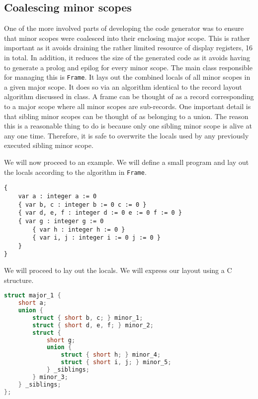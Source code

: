 \documentclass[oneside]{amsart}
\theoremstyle{definition}
\theoremstyle{remark}
\numberwithin{equation}{section}
\begin{document}
\subsection{Coalescing minor scopes}
One of the more involved parts of developing the code generator was to ensure that minor scopes were
coalesced into their enclosing major scope. This is rather important as it avoids draining the
rather limited resource of display registers, 16 in total. In addition, it reduces the size of the
generated code as it avoids having to generate a prolog and epilog for every minor scope. The main
class responsible for managing this is \texttt{Frame}. It lays out the combined locals of all minor
scopes in a given major scope. It does so via an algorithm identical to the record layout algorithm
discussed in class. A frame can be thought of as a record corresponding to a major scope where all
minor scopes are sub-records. One important detail is that sibling minor scopes can be thought of as
belonging to a union. The reason this is a reasonable thing to do is because only one sibling minor
scope is alive at any one time. Therefore, it is safe to overwrite the locals used by any previously
executed sibling minor scope.

\newpage

We will now proceed to an example. We will define a small program and lay out the locals according
to the algorithm in \texttt{Frame}.
\begin{lstlisting}[caption=Major scope in 488]
{
    var a : integer a := 0
    { var b, c : integer b := 0 c := 0 }
    { var d, e, f : integer d := 0 e := 0 f := 0 }
    { var g : integer g := 0
        { var h : integer h := 0 }
        { var i, j : integer i := 0 j := 0 }
    }
}
\end{lstlisting}

\noindent We will proceed to lay out the locals. We will express our layout using a C structure.
\begin{lstlisting}[caption=Layout as C structure, language=C, directivestyle={\color{black}} emph={short}, emphstyle={\color{blue}}]
struct major_1 {
    short a;
    union {
        struct { short b, c; } minor_1;
        struct { short d, e, f; } minor_2;
        struct {
            short g;
            union {
                struct { short h; } minor_4;
                struct { short i, j; } minor_5;
            } _siblings;
        } minor_3;
    } _siblings;
};
\end{lstlisting}
\end{document}
